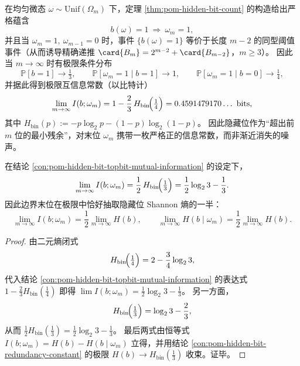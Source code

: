 \begin{conclusion}\label{con:pom-hidden-bit-topbit-mutual-information}
在均匀微态 \(\omega\sim\mathrm{Unif}(\Omega_m)\) 下，定理 \ref{thm:pom-hidden-bit-count} 的构造给出严格蕴含
\[
b(\omega)=1\ \Longrightarrow\ \omega_m=1,
\]
并且当 \(\omega_m=1,\ \omega_{m-1}=0\) 时，事件 \(\{b(\omega)=1\}\) 等价于长度 \(m-2\) 的同型阈值事件（从而诱导精确递推 \(\card{B_m}=2^{m-2}+\card{B_{m-2}}\)，\(m\ge 3\)）。
因此当 \(m\to\infty\) 时有极限条件分布
\[
\mathbb P[b=1]\to\tfrac13,\qquad
\mathbb P[\omega_m=1\mid b=1]\to 1,\qquad
\mathbb P[\omega_m=1\mid b=0]\to\tfrac14,
\]
并据此得到极限互信息常数（以比特计）
\[
\lim_{m\to\infty}I(b;\omega_m)
=1-\frac{2}{3}\,H_{\mathrm{bin}}\!\Bigl(\tfrac14\Bigr)
=0.4591479170\ldots\ \mathrm{bits},
\]
其中 \(H_{\mathrm{bin}}(p):=-p\log_2 p-(1-p)\log_2(1-p)\)。
因此隐藏位作为“超出前 \(m\) 位的最小残余”，对末位 \(\omega_m\) 携带一枚严格正的信息常数，而非渐近消失的噪声。
\end{conclusion}

\begin{corollary}[互信息常数的闭式化简与二分等量律]\label{cor:pom-hidden-bit-topbit-mi-half-entropy}
在结论 \ref{con:pom-hidden-bit-topbit-mutual-information} 的设定下，
\[
\lim_{m\to\infty} I(b;\omega_m)
=\frac12\,H_{\mathrm{bin}}\!\Bigl(\tfrac13\Bigr)
=\frac12\log_2 3-\frac13.
\]
因此边界末位在极限中恰好抽取隐藏位 Shannon 熵的一半：
\[
\lim_{m\to\infty}I(b;\omega_m)=\frac12\lim_{m\to\infty}H(b),
\qquad
\lim_{m\to\infty}H(b\mid \omega_m)=\frac12\lim_{m\to\infty}H(b).
\]
\end{corollary}
\begin{proof}
由二元熵闭式
\[
H_{\mathrm{bin}}\!\Bigl(\tfrac14\Bigr)=2-\frac34\log_2 3,
\]
代入结论 \ref{con:pom-hidden-bit-topbit-mutual-information} 的表达式
\(
1-\frac23 H_{\mathrm{bin}}(\tfrac14)
\)
即得
\(
\lim I(b;\omega_m)=\frac12\log_2 3-\frac13
\)。
另一方面，
\[
H_{\mathrm{bin}}\!\Bigl(\tfrac13\Bigr)=\log_2 3-\frac23,
\]
从而 \(\frac12H_{\mathrm{bin}}(\tfrac13)=\frac12\log_2 3-\frac13\)。
最后两式由恒等式 \(I(b;\omega_m)=H(b)-H(b\mid\omega_m)\) 立得，并用结论 \ref{con:pom-hidden-bit-redundancy-constant} 的极限 \(H(b)\to H_{\mathrm{bin}}(\tfrac13)\) 收束。证毕。
\end{proof}

